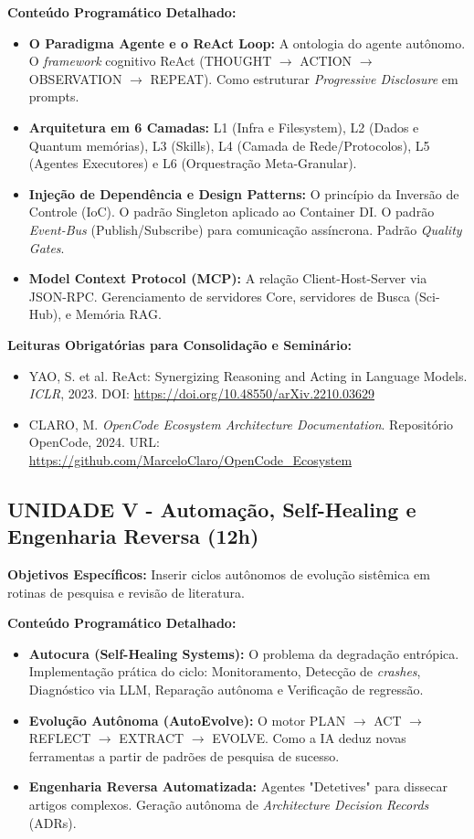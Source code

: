 \documentclass[12pt,a4paper]{article}
\begin{document}
\textbf{Conteúdo Programático Detalhado:}
\begin{itemize}
    \item \textbf{O Paradigma Agente e o ReAct Loop:} A ontologia do agente autônomo. O \textit{framework} cognitivo ReAct (THOUGHT $\rightarrow$ ACTION $\rightarrow$ OBSERVATION $\rightarrow$ REPEAT). Como estruturar \textit{Progressive Disclosure} em prompts.
    \item \textbf{Arquitetura em 6 Camadas:} L1 (Infra e Filesystem), L2 (Dados e Quantum memórias), L3 (Skills), L4 (Camada de Rede/Protocolos), L5 (Agentes Executores) e L6 (Orquestração Meta-Granular).
    \item \textbf{Injeção de Dependência e Design Patterns:} O princípio da Inversão de Controle (IoC). O padrão Singleton aplicado ao Container DI. O padrão \textit{Event-Bus} (Publish/Subscribe) para comunicação assíncrona. Padrão \textit{Quality Gates}.
    \item \textbf{Model Context Protocol (MCP):} A relação Client-Host-Server via JSON-RPC. Gerenciamento de servidores Core, servidores de Busca (Sci-Hub), e Memória RAG.
\end{itemize}

\textbf{Leituras Obrigatórias para Consolidação e Seminário:}
\begin{itemize}
    \item YAO, S. et al. ReAct: Synergizing Reasoning and Acting in Language Models. \textit{ICLR}, 2023. DOI: \url{https://doi.org/10.48550/arXiv.2210.03629} 
    \item CLARO, M. \textit{OpenCode Ecosystem Architecture Documentation}. Repositório OpenCode, 2024. URL: \url{https://github.com/MarceloClaro/OpenCode_Ecosystem}
\end{itemize}

\subsection{UNIDADE V - Automação, Self-Healing e Engenharia Reversa (12h)}
\textbf{Objetivos Específicos:} Inserir ciclos autônomos de evolução sistêmica em rotinas de pesquisa e revisão de literatura.

\textbf{Conteúdo Programático Detalhado:}
\begin{itemize}
    \item \textbf{Autocura (Self-Healing Systems):} O problema da degradação entrópica. Implementação prática do ciclo: Monitoramento, Detecção de \textit{crashes}, Diagnóstico via LLM, Reparação autônoma e Verificação de regressão.
    \item \textbf{Evolução Autônoma (AutoEvolve):} O motor PLAN $\rightarrow$ ACT $\rightarrow$ REFLECT $\rightarrow$ EXTRACT $\rightarrow$ EVOLVE. Como a IA deduz novas ferramentas a partir de padrões de pesquisa de sucesso.
    \item \textbf{Engenharia Reversa Automatizada:} Agentes "Detetives" para dissecar artigos complexos. Geração autônoma de \textit{Architecture Decision Records} (ADRs).
\end{itemize}
\end{document}
